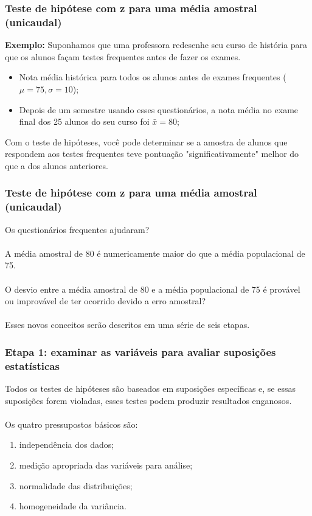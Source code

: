 \documentclass[11pt]{beamer}
\begin{document}
\begin{frame}
\frametitle{Teste de hipótese com z para uma média amostral (unicaudal)}

\textbf{Exemplo:} Suponhamos que uma professora redesenhe seu curso de história para que os alunos façam testes frequentes antes de fazer os exames.

\begin{itemize}
\item
  Nota média histórica para todos os alunos antes de exames frequentes (\(\mu = 75, \sigma = 10\));
\item
  Depois de um semestre usando esses questionários, a nota média no exame final dos 25 alunos do seu curso foi \(\bar{x} = 80\);
\end{itemize}

Com o teste de hipóteses, você pode determinar se a amostra de alunos que respondem aos testes frequentes teve pontuação "significativamente" melhor do que a dos alunos anteriores.

\end{frame}

\begin{frame}
\frametitle{Teste de hipótese com z para uma média amostral (unicaudal)}

Os questionários frequentes ajudaram?\\~\\

A média amostral de 80 é numericamente maior do que a média populacional de 75.\\~\\

O desvio entre a média amostral de 80 e a média populacional de 75 é provável ou improvável de ter ocorrido devido a erro amostral?\\~\\

Esses novos conceitos serão descritos em uma série de seis etapas.

\end{frame}

\begin{frame}
\frametitle{Etapa 1: examinar as variáveis para avaliar suposições estatísticas}

Todos os testes de hipóteses são baseados em suposições específicas e, se essas suposições forem violadas, esses testes podem produzir resultados enganosos.\\~\\
Os quatro pressupostos básicos são:

\begin{enumerate}
\item independência dos dados;
\item medição apropriada das variáveis para análise;
\item normalidade das distribuições;
\item homogeneidade da variância.
\end{enumerate}

\end{frame}
\end{document}
